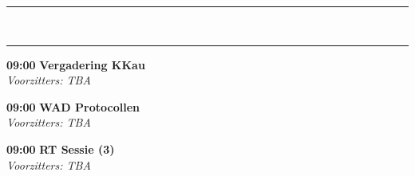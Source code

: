 \documentclass[a4paper,10pt]{report}
\begin{document}
\begin{multicols*}{3}
\hrule\vspace{3mm}
\\
\hrule

\begin{packed_enum}
\item[\textbf{09:00}] \textbf{Vergadering KKau}\\\textit{Voorzitters: TBA}
\end{packed_enum}

\begin{packed_enum}
\item[\textbf{09:00}] \textbf{WAD Protocollen}\\\textit{Voorzitters: TBA}
\end{packed_enum}

\begin{packed_enum}
\item[\textbf{09:00}] \textbf{RT Sessie (3)}\\\textit{Voorzitters: TBA}
\end{packed_enum}


\end{multicols*}
\end{document}
